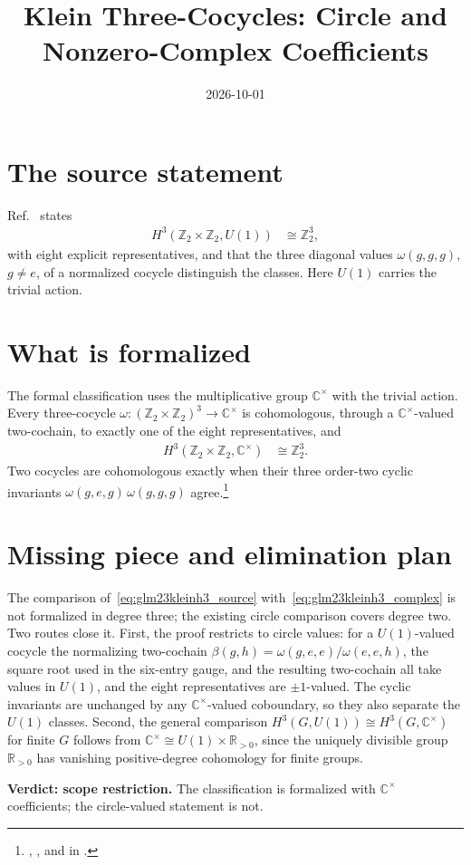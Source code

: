 \documentclass{article}
\title{Klein Three-Cocycles: Circle and Nonzero-Complex Coefficients}
\author{}
\date{2026-10-01}
\begin{document}
\maketitle
{}

\section{The source statement}

Ref.~\cite[Section~6]{GarreRubio2023MPOSym} states
\begin{align}
    H^3(\mathbb{Z}_2\times\mathbb{Z}_2,U(1)) & \cong\mathbb{Z}_2^3,
    \label{eq:glm23kleinh3_source}
\end{align}
with eight explicit representatives, and that the three diagonal values
$\omega(g,g,g)$, $g\neq e$, of a normalized cocycle distinguish the classes.
Here $U(1)$ carries the trivial action.

\section{What is formalized}

The formal classification uses the multiplicative group $\mathbb{C}^\times$
with the trivial action. Every three-cocycle
$\omega:(\mathbb{Z}_2\times\mathbb{Z}_2)^3\to\mathbb{C}^\times$ is cohomologous,
through a $\mathbb{C}^\times$-valued two-cochain, to exactly one of the eight
representatives, and
\begin{align}
    H^3(\mathbb{Z}_2\times\mathbb{Z}_2,\mathbb{C}^\times) & \cong\mathbb{Z}_2^3.
    \label{eq:glm23kleinh3_complex}
\end{align}
Two cocycles are cohomologous exactly when their three order-two cyclic
invariants $\omega(g,e,g)\,\omega(g,g,g)$ agree.\footnote{
    ,
    ,
    and  in
    .}

\section{Missing piece and elimination plan}

The comparison of~\eqref{eq:glm23kleinh3_source}
with~\eqref{eq:glm23kleinh3_complex} is not formalized in degree three; the
existing circle comparison covers degree two. Two routes close it.
First, the proof restricts to circle values: for a $U(1)$-valued cocycle the
normalizing two-cochain $\beta(g,h)=\omega(g,e,e)/\omega(e,e,h)$, the square
root used in the six-entry gauge, and the resulting two-cochain all take
values in $U(1)$, and the eight representatives are $\pm1$-valued. The cyclic
invariants are unchanged by any $\mathbb{C}^\times$-valued coboundary, so they
also separate the $U(1)$ classes. Second, the general comparison
$H^3(G,U(1))\cong H^3(G,\mathbb{C}^\times)$ for finite $G$ follows from
$\mathbb{C}^\times\cong U(1)\times\mathbb{R}_{>0}$, since the uniquely
divisible group $\mathbb{R}_{>0}$ has vanishing positive-degree cohomology
for finite groups.

\textbf{Verdict: scope restriction.} The classification is formalized with
$\mathbb{C}^\times$ coefficients; the circle-valued statement is not.



\end{document}
